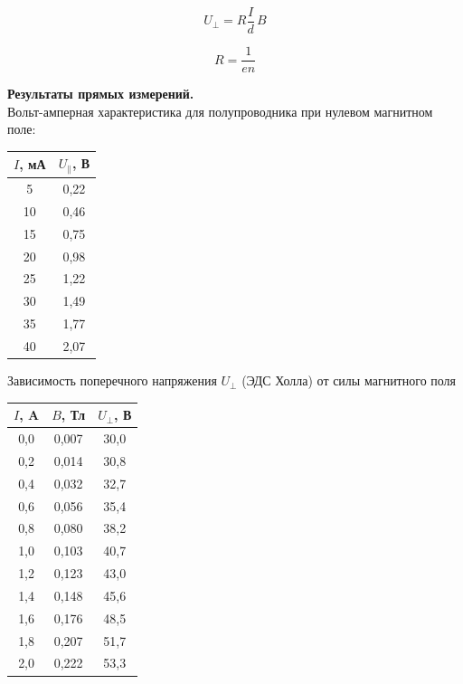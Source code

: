 \documentclass[a4paper]{article}
\begin{document}
\begin{equation}
	U_{\perp}=R\frac{I}{d}\,B
\end{equation}

\begin{equation}
	R=\frac{1}{en}
\end{equation}
	
	
	{\parindent=0pt\textbf{Результаты прямых измерений.}}\\
	Вольт-амперная характеристика для полупроводника при нулевом магнитном поле:
	\begin{center}
	\begin{tabular}{c|c}
		\hline
		$I$, мА&$U_{\parallel}$, В  \\
		\hline
		5&0,22  \\
		10&  0,46\\
		15&  0,75\\
		20&  0,98\\
		25&  1,22\\
		30&  1,49\\
		35&  1,77\\
		40&  2,07\\
		
	\end{tabular}
\end{center}
Зависимость поперечного напряжения $U_{\perp}$ (ЭДС Холла) от силы магнитного поля
\begin{center}
	\begin{tabular}{c|c|c}
		\hline
		$I$, A&$B$, Тл  & $U_{\perp}$, В \\
		\hline
		0,0& 0,007 &  30,0\\
		0,2&  	0,014		&  30,8\\
		0,4&  	0,032		&  32,7\\
		0,6&  		0,056	& 35,4 \\
		0,8& 			0,080 & 38,2 \\
		1,0&  			0,103	&  40,7\\
		1,2&  			0,123	& 43,0 \\
		1,4&  		0,148	& 45,6 \\
		1,6&  			0,176& 48,5 \\
		1,8& 			 0,207&  51,7\\
		2,0& 				 0,222& 53,3 \\
	\end{tabular}
\end{center}
\end{document}
